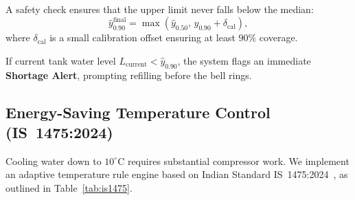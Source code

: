 \documentclass[conference]{IEEEtran}
\begin{document}
A safety check ensures that the upper limit never falls below the median:
\begin{equation}
\hat{y}_{0.90}^{\text{final}} = \max\left( \hat{y}_{0.50},\, \hat{y}_{0.90} + \delta_{\text{cal}} \right),
\end{equation}
where $\delta_{\text{cal}}$ is a small calibration offset ensuring at least $90\%$ coverage.

If current tank water level $L_{\text{current}} < \hat{y}_{0.90}$, the system flags an immediate \textbf{Shortage Alert}, prompting refilling before the bell rings.

\subsection{Energy-Saving Temperature Control (IS~1475:2024)}
Cooling water down to $10^\circ\text{C}$ requires substantial compressor work. We implement an adaptive temperature rule engine based on Indian Standard IS~1475:2024~\cite{bis2024is1475}, as outlined in Table~\ref{tab:is1475}.

\begin{table}[!t]
\centering
\caption{IS 1475:2024 Temperature Control Rules}
\label{tab:is1475}
\end{table}
\end{document}
